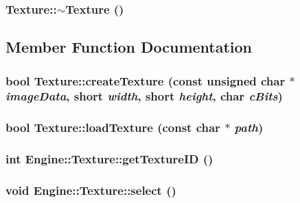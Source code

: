 \subsubsection{\setlength{\rightskip}{0pt plus 5cm}Texture::$\sim$Texture ()}\label{classEngine_1_1Texture_09c4bcb7462f64c1d20fa69dba3cee8a}




\subsection{Member Function Documentation}
\subsubsection{\setlength{\rightskip}{0pt plus 5cm}bool Texture::createTexture (const unsigned char $\ast$ {\em imageData}, short {\em width}, short {\em height}, char {\em cBits})}\label{classEngine_1_1Texture_b9f0d190992e23d50e2e641062ed3391}


\subsubsection{\setlength{\rightskip}{0pt plus 5cm}bool Texture::loadTexture (const char $\ast$ {\em path})}\label{classEngine_1_1Texture_18df2963c609f5c6ce68821b90e66626}


\subsubsection{\setlength{\rightskip}{0pt plus 5cm}int Engine::Texture::getTextureID ()\hspace{0.3cm}{\tt  [inline]}}\label{classEngine_1_1Texture_498e7ca803fd42f51a98263347fcb4a4}


\subsubsection{\setlength{\rightskip}{0pt plus 5cm}void Engine::Texture::select ()\hspace{0.3cm}{\tt  [inline]}}\label{classEngine_1_1Texture_980dfe91879680e9e6a497847f405cba}


